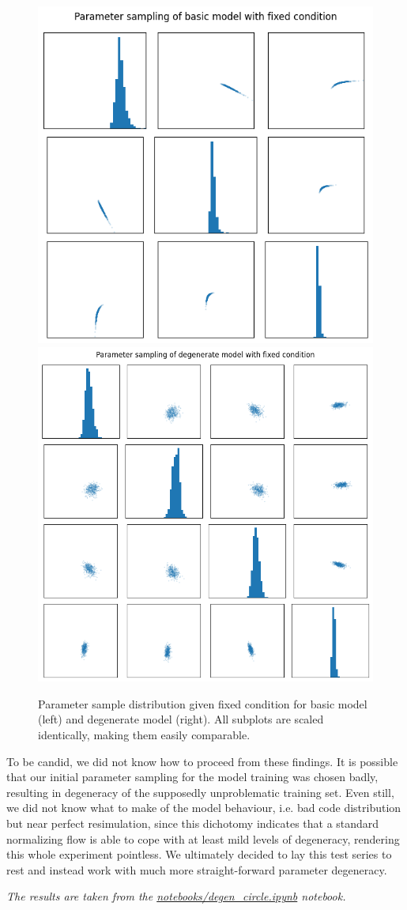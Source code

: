 \begin{figure}
\centering
\includegraphics[width=.39\textwidth]{images/sbi_sir/run_2/basic param sampling.png}
\hspace{1em}
\includegraphics[width=.52\textwidth]{images/sbi_sir/run_2/degen param sampling.png}
\caption{Parameter sample distribution given fixed condition for basic model (left) and degenerate model (right). All subplots are scaled identically, making them easily comparable.}
\label{fig:sir_run_2_params}
\end{figure}

To be candid, we did not know how to proceed from these findings. It is possible that our initial parameter sampling for the model training was chosen badly, resulting in degeneracy of the supposedly unproblematic training set. Even still, we did not know what to make of the model behaviour, i.e. bad code distribution but near perfect resimulation, since this dichotomy indicates that a standard normalizing flow is able to cope with at least mild levels of degeneracy, rendering this whole experiment pointless. We ultimately decided to lay this test series to rest and instead work with much more straight-forward parameter degeneracy.

\label{sec:simple_degen}

\textit{The results are taken from the \href{https://github.com/xiaoxiae/GNNFinal2024/blob/main/notebooks/degen_circle.ipynb}{notebooks/degen\_circle.ipynb} notebook.}

